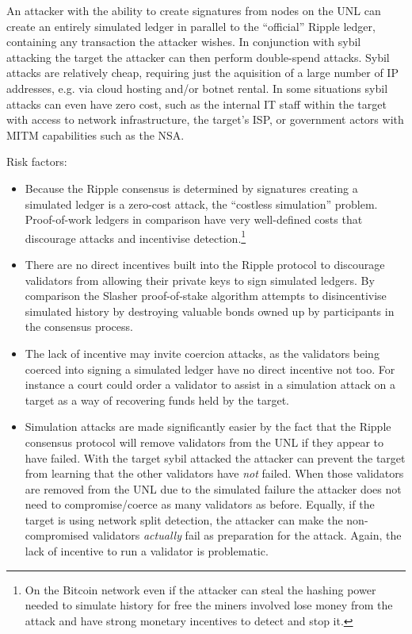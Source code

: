 \documentclass{article}
\begin{document}
An attacker with the ability to create signatures from nodes on the UNL can
create an entirely simulated ledger in parallel to the ``official'' Ripple
ledger, containing any transaction the attacker wishes. In conjunction with
sybil attacking the target the attacker can then perform double-spend attacks.
Sybil attacks are relatively cheap, requiring just the aquisition of a large
number of IP addresses, e.g. via cloud hosting and/or botnet rental. In some
situations sybil attacks can even have zero cost, such as the internal IT staff
within the target with access to network infrastructure, the target's ISP, or
government actors with MITM capabilities such as the
NSA.\cite{schneier-nsa-mitm}

Risk factors:

\begin{itemize}

    \item Because the Ripple consensus is determined by signatures creating a
        simulated ledger is a zero-cost attack, the ``costless
        simulation''\cite[4.2]{apoelstra-on-stake} problem. Proof-of-work
        ledgers in comparison have very well-defined costs that discourage
        attacks and incentivise detection.\footnote{On the Bitcoin network even
            if the attacker can steal the hashing power needed to simulate
        history for free the miners involved lose money from the attack and
    have strong monetary incentives to detect and stop it.}

    \item There are no direct incentives built into the Ripple protocol to
        discourage validators from allowing their private keys to sign
        simulated ledgers. By comparison the Slasher proof-of-stake algorithm
        attempts to disincentivise simulated history by destroying valuable
        bonds owned up by participants in the consensus
        process.\cite{ethereum-blog-slasher}

    \item The lack of incentive may invite coercion attacks, as the validators
        being coerced into signing a simulated ledger have no direct incentive
        not too. For instance a court could order a validator to assist in a
        simulation attack on a target as a way of recovering funds held by the
        target.

    \item Simulation attacks are made significantly easier by the fact that the
        Ripple consensus protocol will remove validators from the UNL if they
        appear to have failed.\cite[3.4.2]{ripple-consensus-paper} With the
        target sybil attacked the attacker can prevent the target from learning
        that the other validators have \emph{not} failed. When those validators
        are removed from the UNL due to the simulated failure the attacker does
        not need to compromise/coerce as many validators as before. Equally, if
        the target is using network split detection, the attacker can make the
        non-compromised validators \emph{actually} fail as preparation for the
        attack. Again, the lack of incentive to run a validator is problematic.


\end{itemize}
\end{document}

